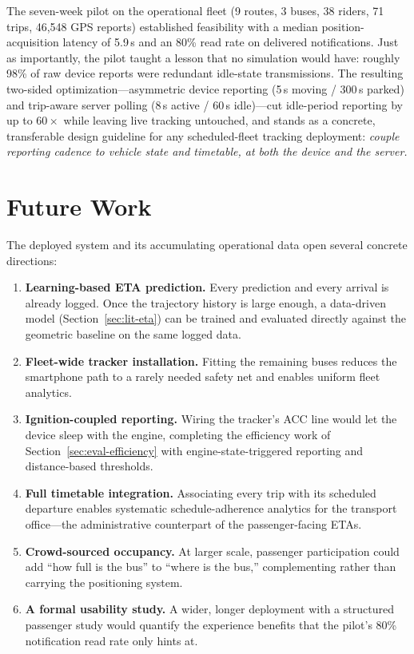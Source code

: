 The seven-week pilot on the operational fleet (9 routes, 3 buses, 38
riders, 71 trips, 46{,}548 GPS reports) established feasibility with a
median position-acquisition latency of 5.9\,s and an 80\% read rate on
delivered notifications. Just as importantly, the pilot taught a lesson
that no simulation would have: roughly 98\% of raw device reports were
redundant idle-state transmissions. The resulting two-sided
optimization---asymmetric device reporting (5\,s moving / 300\,s
parked) and trip-aware server polling (8\,s active / 60\,s idle)---cut
idle-period reporting by up to $60\times$ while leaving live tracking
untouched, and stands as a concrete, transferable design guideline for
any scheduled-fleet tracking deployment: \emph{couple reporting cadence
to vehicle state and timetable, at both the device and the server.}

\section{Future Work}
\label{sec:concl-future}
The deployed system and its accumulating operational data open several
concrete directions:

\begin{enumerate}
  \item \textbf{Learning-based ETA prediction.} Every prediction and
  every arrival is already logged. Once the trajectory history is large
  enough, a data-driven model (Section~\ref{sec:lit-eta}) can be trained
  and evaluated directly against the geometric baseline on the same
  logged data.
  \item \textbf{Fleet-wide tracker installation.} Fitting the remaining
  buses reduces the smartphone path to a rarely needed safety net and
  enables uniform fleet analytics.
  \item \textbf{Ignition-coupled reporting.} Wiring the tracker's ACC
  line would let the device sleep with the engine, completing the
  efficiency work of Section~\ref{sec:eval-efficiency} with
  engine-state-triggered reporting and distance-based thresholds.
  \item \textbf{Full timetable integration.} Associating every trip with
  its scheduled departure enables systematic schedule-adherence
  analytics for the transport office---the administrative counterpart of
  the passenger-facing ETAs.
  \item \textbf{Crowd-sourced occupancy.} At larger scale, passenger
  participation could add ``how full is the bus'' to ``where is the
  bus,'' complementing rather than carrying the positioning system.
  \item \textbf{A formal usability study.} A wider, longer deployment
  with a structured passenger study would quantify the experience
  benefits that the pilot's 80\% notification read rate only hints at.
\end{enumerate}

